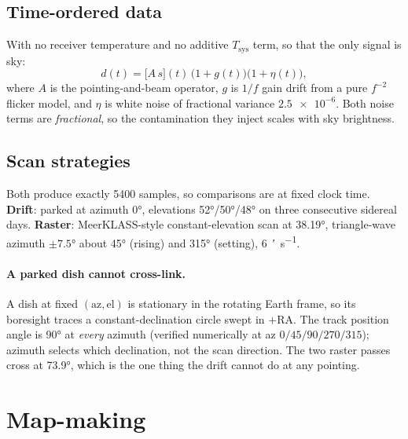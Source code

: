 \documentclass[a4paper,fleqn,usenatbib]{mnras}
\begin{document}
\subsection{Time-ordered data}
With no receiver temperature and no additive $T_{\mathrm{sys}}$ term, so that
the only signal is sky:
\begin{equation}
  d(t) = \bigl[ A\,s \bigr](t)\,\bigl(1 + g(t)\bigr)\bigl(1 + \eta(t)\bigr),
  \label{eq:tod}
\end{equation}
where $A$ is the pointing-and-beam operator, $g$ is $1/f$ gain drift from a
pure $f^{-2}$ flicker model, and $\eta$ is white noise of fractional variance
$\num{2.5e-6}$. Both noise terms are \emph{fractional}, so the contamination
they inject scales with sky brightness.

\subsection{Scan strategies}
Both produce exactly 5400 samples, so comparisons are at fixed clock time.
\textbf{Drift}: parked at azimuth \ang{0}, elevations \ang{52}/\ang{50}/\ang{48}
on three consecutive sidereal days. \textbf{Raster}: MeerKLASS-style
constant-elevation scan at \ang{38.19}, triangle-wave azimuth $\pm\ang{7.5}$
about \ang{45} (rising) and \ang{315} (setting), \SI{6}{\arcminute\per\second}.

\paragraph{A parked dish cannot cross-link.}
A dish at fixed $(\mathrm{az}, \mathrm{el})$ is stationary in the rotating
Earth frame, so its boresight traces a constant-declination circle swept in
$+\mathrm{RA}$. The track position angle is \ang{90} at \emph{every} azimuth
(verified numerically at az $0/45/90/270/315$); azimuth selects which
declination, not the scan direction. The two raster passes cross at \ang{73.9},
which is the one thing the drift cannot do at any pointing.

\section{Map-making}
\label{sec:mapmaking}
\end{document}
